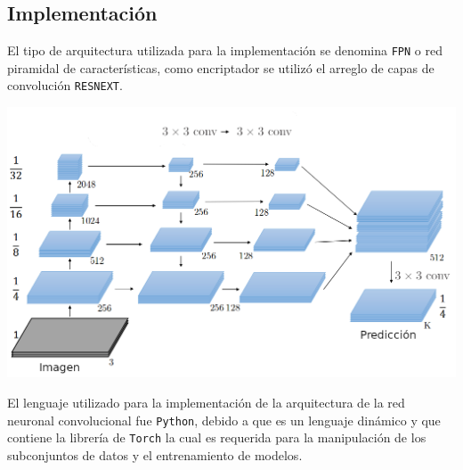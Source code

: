 \documentclass[a0,portrait]{a0poster}
\begin{document}
\begin{multicols}{3}
\section*{Implementación}

El tipo de arquitectura utilizada para la implementación se denomina \texttt{FPN} o red piramidal de características, como encriptador se utilizó el arreglo de capas de convolución \texttt{RESNEXT}.
\begin{center}
    \includegraphics[scale=0.70]{fpn_ar_esp_2.png}
    \label{fig:fpn_map}
\end{center}

El lenguaje utilizado para la implementación de la arquitectura de la red neuronal convolucional fue \texttt{Python}, debido a que es un lenguaje dinámico y que contiene la librería de \texttt{Torch} la cual es requerida para la manipulación de los subconjuntos de datos y el entrenamiento de modelos.

\renewcommand{\lstlistingname}{Código}



\end{multicols}
\end{document}
